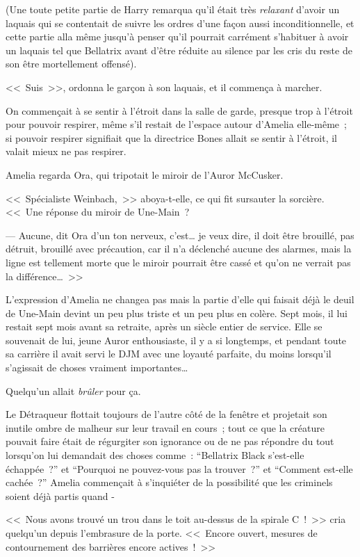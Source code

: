 (Une toute petite partie de Harry remarqua qu'il était très \emph{relaxant} d'avoir un laquais qui se contentait de suivre les ordres d'une façon aussi inconditionnelle, et cette partie alla même jusqu'à penser qu'il pourrait carrément s'habituer à avoir un laquais tel que Bellatrix avant d'être réduite au silence par les cris du reste de son être mortellement offensé).

<<~Suis~>>, ordonna le garçon à son laquais, et il commença à marcher.

\later

On commençait à se sentir à l'étroit dans la salle de garde, presque trop à l'étroit pour pouvoir respirer, même s'il restait de l'espace autour d'Amelia elle-même~; si pouvoir respirer signifiait que la directrice Bones allait se sentir à l'étroit, il valait mieux ne pas respirer.

Amelia regarda Ora, qui tripotait le miroir de l'Auror McCusker.

<<~Spécialiste Weinbach,~>> aboya-t-elle, ce qui fit sursauter la sorcière. <<~Une réponse du miroir de Une-Main~?

--- Aucune, dit Ora d'un ton nerveux, c'est… je veux dire, il doit être brouillé, pas détruit, brouillé avec précaution, car il n'a déclenché aucune des alarmes, mais la ligne est tellement morte que le miroir pourrait être cassé et qu'on ne verrait pas la différence…~>>

L'expression d'Amelia ne changea pas mais la partie d'elle qui faisait déjà le deuil de Une-Main devint un peu plus triste et un peu plus en colère. Sept mois, il lui restait sept mois avant sa retraite, après un siècle entier de service. Elle se souvenait de lui, jeune Auror enthousiaste, il y a si longtemps, et pendant toute sa carrière il avait servi le DJM avec une loyauté parfaite, du moins lorsqu'il s'agissait de choses vraiment importantes…

Quelqu'un allait \emph{brûler} pour ça.

Le Détraqueur flottait toujours de l'autre côté de la fenêtre et projetait son inutile ombre de malheur sur leur travail en cours~; tout ce que la créature pouvait faire était de régurgiter son ignorance ou de ne pas répondre du tout lorsqu'on lui demandait des choses comme~: “Bellatrix Black s'est-elle échappée~?” et “Pourquoi ne pouvez-vous pas la trouver~?” et “Comment est-elle cachée~?” Amelia commençait à s'inquiéter de la possibilité que les criminels soient déjà partis quand -

<<~Nous avons trouvé un trou dans le toit au-dessus de la spirale C~!~>> cria quelqu'un depuis l'embrasure de la porte. <<~Encore ouvert, mesures de contournement des barrières encore actives~!~>>

